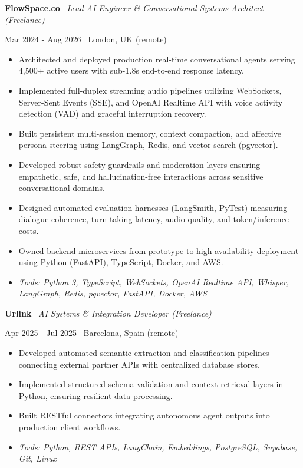 \documentclass[a4paper,10pt]{article}
\newcommand{\role}[4]{%
  \vspace{2pt}\noindent
  \begin{minipage}[t]{0.70\textwidth}\raggedright\textbf{#1} \textbullet\ \textit{#3}\end{minipage}%
  \hfill
  \begin{minipage}[t]{0.28\textwidth}\raggedleft\footnotesize\color{gray}#2 \textbullet\ #4\end{minipage}%
  \vspace{1pt}%
}
\begin{document}
\role{\href{https://flowspace.co}{FlowSpace.co}}{Mar 2024 - Aug 2026}{Lead AI Engineer \& Conversational Systems Architect (Freelance)}{London, UK (remote)}
\begin{itemize}
  \item Architected and deployed production real-time conversational agents serving 4,500+ active users with sub-1.8s end-to-end response latency.
  \item Implemented full-duplex streaming audio pipelines utilizing WebSockets, Server-Sent Events (SSE), and OpenAI Realtime API with voice activity detection (VAD) and graceful interruption recovery.
  \item Built persistent multi-session memory, context compaction, and affective persona steering using LangGraph, Redis, and vector search (pgvector).
  \item Developed robust safety guardrails and moderation layers ensuring empathetic, safe, and hallucination-free interactions across sensitive conversational domains.
  \item Designed automated evaluation harnesses (LangSmith, PyTest) measuring dialogue coherence, turn-taking latency, audio quality, and token/inference costs.
  \item Owned backend microservices from prototype to high-availability deployment using Python (FastAPI), TypeScript, Docker, and AWS.
  \item \textit{Tools: Python 3, TypeScript, WebSockets, OpenAI Realtime API, Whisper, LangGraph, Redis, pgvector, FastAPI, Docker, AWS}
\end{itemize}

\role{Urlink}{Apr 2025 - Jul 2025}{AI Systems \& Integration Developer (Freelance)}{Barcelona, Spain (remote)}
\begin{itemize}
  \item Developed automated semantic extraction and classification pipelines connecting external partner APIs with centralized database stores.
  \item Implemented structured schema validation and context retrieval layers in Python, ensuring resilient data processing.
  \item Built RESTful connectors integrating autonomous agent outputs into production client workflows.
  \item \textit{Tools: Python, REST APIs, LangChain, Embeddings, PostgreSQL, Supabase, Git, Linux}
\end{itemize}
\end{document}
